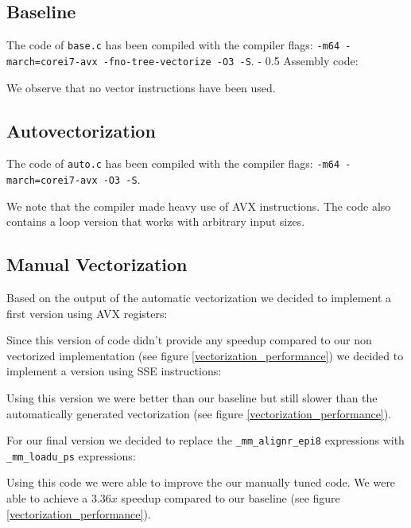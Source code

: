 \documentclass[portrait,a4paper]{article}
\makeatletter
\renewcommand\paragraph{\@startsection{paragraph}{4}{0mm}%
    {-\baselineskip}%
    {0.5\baselineskip}%
    {\normalfont\bfseries}%
}%
\makeatother
\begin{document}
\subsection{Baseline}
The code of \lstinline{base.c} has been compiled with the compiler flags: \lstinline{-m64 -march=corei7-avx -fno-tree-vectorize -O3 -S}.
\paragraph{Assembly code:} 


We observe that no vector instructions have been used.

\subsection{Autovectorization}
The code of \lstinline{auto.c} has been compiled with the compiler flags: \lstinline{-m64 -march=corei7-avx -O3 -S}.


We note that the compiler made heavy use of AVX instructions. The code also contains a loop version that works with arbitrary input sizes. 

\subsection{Manual Vectorization}
Based on the output of the automatic vectorization we decided to implement a first version using AVX registers:

Since this version of code didn't provide any speedup compared to our non vectorized implementation (see figure \ref{vectorization_performance}) we decided to implement a version using SSE instructions:

Using this version we were better than our baseline but still slower than the automatically generated vectorization (see figure \ref{vectorization_performance}).

For our final version we decided to replace the \lstinline{_mm_alignr_epi8} expressions with \lstinline{_mm_loadu_ps} expressions:

Using this code we were able to improve the our manually tuned code. We were able to achieve a $3.36x$ speedup compared to our baseline (see figure  \ref{vectorization_performance}).
\end{document}
